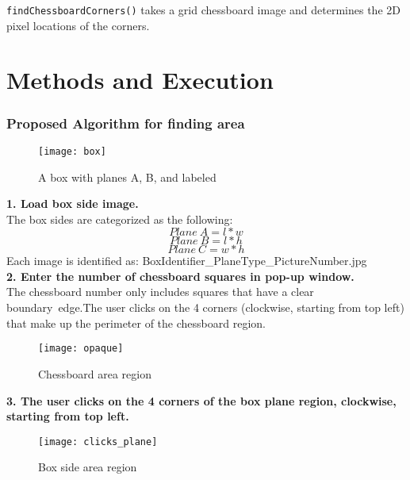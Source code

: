 \documentclass[11pt, twoside, reqno]{book}
\begin{document}
\texttt{findChessboardCorners()} takes a grid chessboard image and determines the 2D pixel locations of the corners. 

\chapter{Methods and Execution}
\label{label}

\subsection{Proposed Algorithm for finding area} 

\begin{figure} [H]
	\graphicspath{ {images/} }
	\texttt{[image: box]}
	\caption{A box with planes A, B, and labeled}
\end{figure}

	


 \textbf{ 1. Load box side image.} \\
The box sides are categorized as the following:\\
\[Plane\ A = l*w\] 
\[Plane\ B = l*h\] 
\[Plane\ C = w*h\] 
Each image is identified as: BoxIdentifier\_PlaneType\_PictureNumber.jpg \\

\textbf{2. Enter the number of chessboard squares in pop-up window.}\\
The chessboard number only includes squares that have a clear boundary\ edge.The user clicks on the 4 corners (clockwise, starting from top left) that make up the perimeter of the chessboard region. \\

\begin{figure}[H]
	\begin{center}
				\graphicspath{ {images/} }
		
		\texttt{[image: opaque]}
		\caption{Chessboard area region}
	\end{center}

\end{figure}



\textbf{3. The user clicks on the 4 corners of the box plane region, clockwise, starting from top left.}\\

\begin{figure} [H]
	\begin{center}
			\graphicspath{ {images/} }
		\texttt{[image: clicks\_plane]}
		\caption{Box side area region}
	\end{center}
	
\end{figure}
\end{document}
